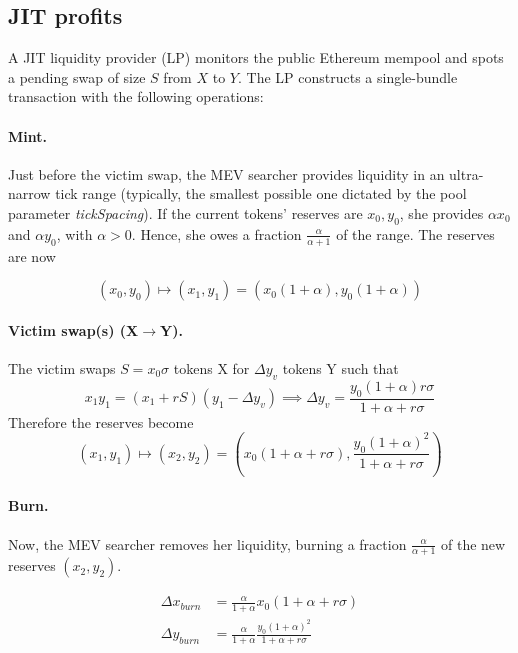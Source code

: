 \documentclass[a4paper,11pt]{article}
\begin{document}
\subsection{JIT profits}
A JIT liquidity provider (LP) monitors the public Ethereum mempool and spots a pending swap of size $S$ from $X$ to $Y$. The LP constructs a single-bundle transaction with the following operations:

\paragraph{Mint.} Just before the victim swap, the MEV searcher provides liquidity in an ultra-narrow tick range (typically, the smallest possible one dictated by the pool parameter \textit{tickSpacing}). If the current tokens' reserves are $x_0, y_0$, she provides $\alpha x_0$ and $\alpha y_0$, with $\alpha > 0$. Hence,  she owes a fraction $\frac{\alpha}{\alpha+1}$ of the range.
The reserves are now

\begin{equation}
    (x_0,y_0) \mapsto (x_1,y_1) = \left(x_0(1+\alpha), y_0(1+\alpha)\right)
\end{equation}
\paragraph{Victim swap(s) (X$\to$Y).} The victim swaps $S=x_0\sigma$ tokens X for $\Delta y_v$ tokens Y such that
\begin{equation}
    x_1y_1 = (x_1+rS)(y_1-\Delta y_v) \implies\Delta y_v = \frac{y_0(1+\alpha) r \sigma}{1+\alpha+r\sigma}
\end{equation}
Therefore the reserves become
\begin{equation}
    (x_1,y_1) \mapsto(x_2,y_2) = \left(x_0(1+\alpha+r\sigma), \frac{y_0 (1+\alpha)^2}{1+\alpha+r\sigma}\right)
\end{equation}
\paragraph{Burn.} Now, the MEV searcher removes her liquidity, burning a fraction $\frac{\alpha}{\alpha+1}$ of the new reserves $(x_2, y_2)$.

\begin{align}
    \Delta x_{burn} &= \frac{\alpha}{1+\alpha}x_0(1+\alpha+r\sigma) \\
    \Delta y_{burn} &= \frac{\alpha}{1+\alpha}\frac{y_0(1+\alpha)^2}{1+\alpha+r\sigma}
\end{align}
\end{document}
